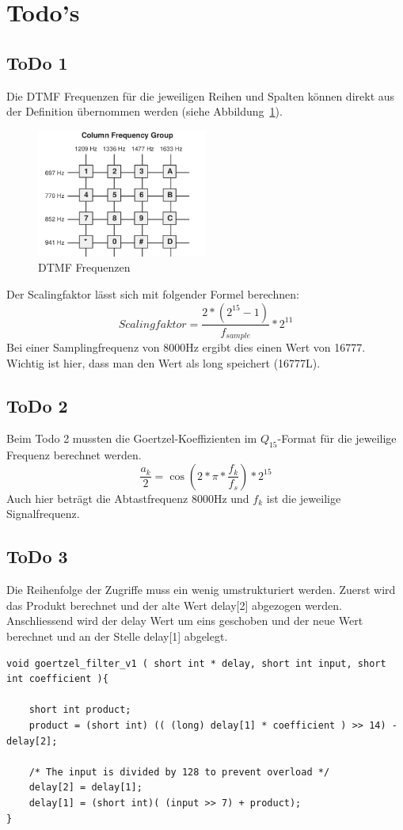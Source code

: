 \documentclass[a4paper,11pt]{article}
\begin{document}
\section{Todo's}
\subsection{ToDo 1}
Die DTMF Frequenzen für die jeweiligen Reihen und Spalten können direkt aus der Definition übernommen werden (siehe Abbildung~\ref{fig:DTMF_freq}).
\begin{figure}[h!]
\centering
\includegraphics[width=0.5\textwidth]{DTMF_freq}
\caption{DTMF Frequenzen}
\label{fig:DTMF_freq}
\end{figure}
\newline
Der Scalingfaktor lässt sich mit folgender Formel berechnen:
\begin{equation*}\label{eq:Scalingfakt}
	Scalingfaktor = \frac{2*(2^{15}-1)}{f_{sample}}*2^{11}
\end{equation*}
Bei einer Samplingfrequenz von 8000Hz ergibt dies einen Wert von 16777. Wichtig ist hier, dass man den Wert als long speichert (16777L). 

\subsection{ToDo 2}
Beim Todo 2 mussten die Goertzel-Koeffizienten im $Q_{15}$-Format für die jeweilige Frequenz berechnet werden.
\begin{equation*}\label{eq:Goertzel_Koeff}
	\frac{a_k}{2}= \cos(2*\pi*\frac{f_k}{f_s})*2^{15}
\end{equation*}
Auch hier beträgt die Abtastfrequenz 8000Hz und $f_k$ ist die jeweilige Signalfrequenz.

\subsection{ToDo 3}
Die Reihenfolge der Zugriffe muss ein wenig umstrukturiert werden. Zuerst wird das Produkt berechnet und der alte Wert delay[2] abgezogen werden. Anschliessend wird der delay Wert um eins geschoben und der neue Wert berechnet und an der Stelle delay[1] abgelegt. 
\begin{lstlisting}
void goertzel_filter_v1 ( short int * delay, short int input, short int coefficient ){
	
	short int product;
	product = (short int) (( (long) delay[1] * coefficient ) >> 14) - delay[2];

	/* The input is divided by 128 to prevent overload */
	delay[2] = delay[1];
	delay[1] = (short int)( (input >> 7) + product);
}
\end{lstlisting}
\end{document}
